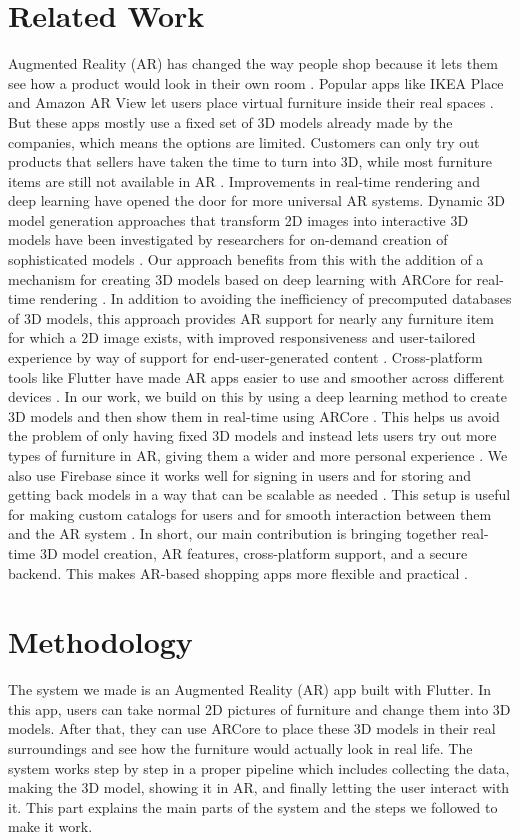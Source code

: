 \documentclass[12pt, a4paper]{article}
\begin{document}
\section{Related Work}
Augmented Reality (AR) has changed the way people shop because it lets them see how a product would look in their own room \cite{ref1}. Popular apps like IKEA Place and Amazon AR View let users place virtual furniture inside their real spaces \cite{ref7}. But these apps mostly use a fixed set of 3D models already made by the companies, which means the options are limited. Customers can only try out products that sellers have taken the time to turn into 3D, while most furniture items are still not available in AR \cite{ref14}. Improvements in real-time rendering and deep learning have opened the door for more universal AR systems. Dynamic 3D model generation approaches that transform 2D images into interactive 3D models have been investigated by researchers for on-demand creation of sophisticated models \cite{ref12}. Our approach benefits from this with the addition of a mechanism for creating 3D models based on deep learning with ARCore for real-time rendering \cite{ref2}. In addition to avoiding the inefficiency of precomputed databases of 3D models, this approach provides AR support for nearly any furniture item for which a 2D image exists, with improved responsiveness and user-tailored experience by way of support for end-user-generated content \cite{ref5}. Cross-platform tools like Flutter have made AR apps easier to use and smoother across different devices \cite{ref9}. In our work, we build on this by using a deep learning method to create 3D models and then show them in real-time using ARCore \cite{ref2}. This helps us avoid the problem of only having fixed 3D models and instead lets users try out more types of furniture in AR, giving them a wider and more personal experience \cite{ref5}. We also use Firebase since it works well for signing in users and for storing and getting back models in a way that can be scalable as needed \cite{ref4,ref10}. This setup is useful for making custom catalogs for users and for smooth interaction between them and the AR system \cite{ref20}. In short, our main contribution is bringing together real-time 3D model creation, AR features, cross-platform support, and a secure backend. This makes AR-based shopping apps more flexible and practical \cite{ref17}.

\section{Methodology}
The system we made is an Augmented Reality (AR) app built with Flutter. In this app, users can take normal 2D pictures of furniture and change them into 3D models. After that, they can use ARCore \cite{ref2} to place these 3D models in their real surroundings and see how the furniture would actually look in real life. The system works step by step in a proper pipeline which includes collecting the data, making the 3D model, showing it in AR, and finally letting the user interact with it. This part explains the main parts of the system and the steps we followed to make it work.
\end{document}
